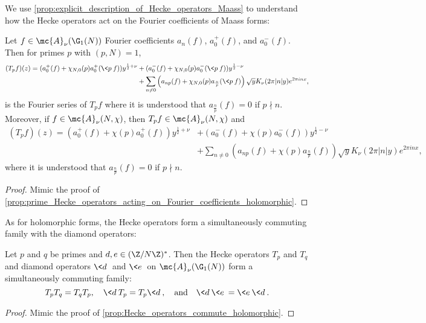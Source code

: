     We use \cref{prop:explicit_description_of_Hecke_operators_Maass} to understand how the Hecke operators act on the Fourier coefficients of Maass forms:

    \begin{proposition}\label{prop:prime_Hecke_operators_acting_on_Fourier_coefficients_Maass}
      Let $f \in \mc{A}_{\nu}(\G_{1}(N))$ Fourier coefficients $a_{n}(f)$, $a_{0}^{+}(f)$, and $a_{0}^{-}(f)$. Then for primes $p$ with $(p,N) = 1$,
      \begin{align*}
        (T_{p}f)(z) = (a_{0}^{+}(f)+\chi_{N,0}(p)a_{0}^{+}(\<p\>f))y^{\frac{1}{2}+\nu}&+(a_{0}^{-}(f)+\chi_{N,0}(p)a_{0}^{-}(\<p\>f))y^{\frac{1}{2}-\nu} \\
        &+ \sum_{n \neq 0}\left(a_{np}(f)+\chi_{N,0}(p)a_{\frac{n}{p}}(\<p\>f)\right)\sqrt{y}K_{\nu}(2\pi|n|y)e^{2\pi inx},
      \end{align*}
      is the Fourier series of $T_{p}f$ where it is understood that $a_{\frac{n}{p}}(f) = 0$ if $p \nmid n$. Moreover, if $f \in \mc{A}_{\nu}(N,\chi)$, then $T_{p}f \in \mc{A}_{\nu}(N,\chi)$ and
      \begin{align*}
        (T_{p}f)(z) = (a_{0}^{+}(f)+\chi(p)a_{0}^{+}(f))y^{\frac{1}{2}+\nu}&+(a_{0}^{-}(f)+\chi(p)a_{0}^{-}(f))y^{\frac{1}{2}-\nu} \\
        &+ \sum_{n \neq 0}\left(a_{np}(f)+\chi(p)a_{\frac{n}{p}}(f)\right)\sqrt{y}K_{\nu}(2\pi|n|y)e^{2\pi inx},
      \end{align*}
      where it is understood that $a_{\frac{n}{p}}(f) = 0$ if $p \nmid n$.
    \end{proposition}
    \begin{proof}
      Mimic the proof of \cref{prop:prime_Hecke_operators_acting_on_Fourier_coefficients_holomorphic}.
    \end{proof}

    As for holomorphic forms, the Hecke operators form a simultaneously commuting family with the diamond operators:

    \begin{proposition}\label{prop:Hecke_operators_commute_Maass}
      Let $p$ and $q$ be primes and $d,e \in (\Z/N\Z)^{\ast}$. Then the Hecke operators $T_{p}$ and $T_{q}$ and diamond operators $\<d\>$ and $\<e\>$ on $\mc{A}_{\nu}(\G_{1}(N))$ form a simultaneously commuting family:
      \[
        T_{p}T_{q} = T_{q}T_{p}, \quad \<d\>T_{p} = T_{p}\<d\>, \quad \text{and} \quad \<d\>\<e\> = \<e\>\<d\>.
      \]
    \end{proposition}
    \begin{proof}
      Mimic the proof of \cref{prop:Hecke_operators_commute_holomorphic}.
    \end{proof}

